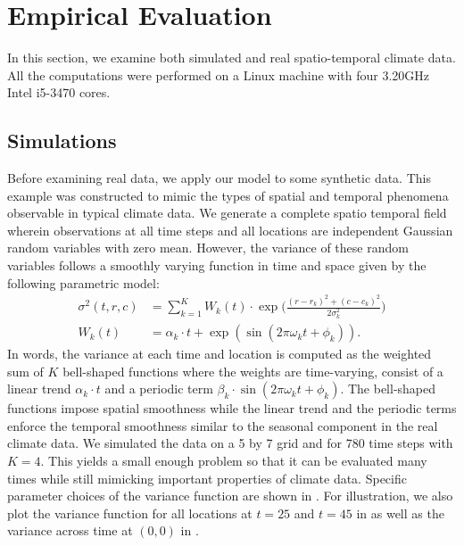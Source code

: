 \documentclass[letterpaper]{article} %
\newcommand{\autoref}{\Cref}
\begin{document}
\section{Empirical Evaluation}
\label{sec:empirical-evaluation}

In this section, we examine both simulated and real spatio-temporal
climate data. All the computations were performed on a Linux machine
with four 3.20GHz Intel i5-3470 cores. 

\subsection{Simulations}
\label{sec:simulations}

Before examining real data, we apply our model to some synthetic
data. This example was constructed to mimic the types of spatial and
temporal phenomena observable in typical climate data. We generate a
complete spatio temporal field wherein 
observations at all time steps and all locations are
independent Gaussian random variables with zero mean. However, the
variance of these random variables follows a smoothly varying function
in time and space given by the following parametric model:
\begin{align}
  \sigma^2(t,r,c) & =\sum_{k=1}^{K} W_k(t) \cdot \exp\bigg(
                    \frac{(r-r_k)^2+(c-c_k)^2} {2\sigma_k^2} \bigg)\\
  W_k(t) & =\alpha_k \cdot t + \exp(\sin(2\pi\omega_k t+\phi_k)) .
\label{eq:sourceVar}
\end{align}
In words, the variance at each time and location is computed as the
weighted sum of $K$ bell-shaped functions where the weights are
time-varying, consist of a linear trend $\alpha_k \cdot t$ and a
periodic term $\beta_k \cdot \sin(2\pi\omega_k t+\phi_k)$. The
bell-shaped functions impose spatial smoothness while the linear
trend and the periodic terms enforce the temporal smoothness similar
to the seasonal component in the real climate data. We simulated the
data on a 5 by 7 grid and for 780 time steps with $K=4$. This yields a
small enough problem so that it can be evaluated many times while
still mimicking important properties of climate data.
Specific parameter choices of the variance function are shown in
\autoref{tab:sim_params}.
For illustration, we also plot the
variance function for all locations at $t=25$ and $t=45$ in as well as
the variance across time at $(0,0)$ in \autoref{fig:true_var_spatial}.
\end{document}
